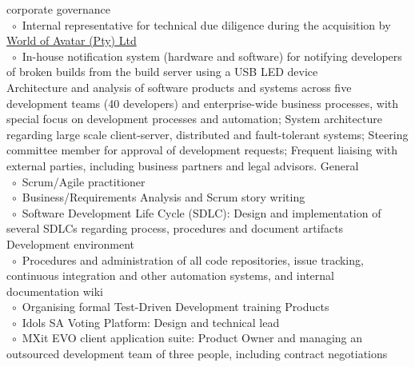 \documentclass[10pt,a4paper,final]{columncv}
\newcommand{\cvitembullet}{~$\circ$~}
\newcommand{\cvitempbullet}{\phantom{\cvitembullet}}
\begin{document}
\begin{cvenv}
{         \cvitempbullet corporate governance \\
         \cvitembullet Internal representative for technical due diligence during the 
         \cvitempbullet acquisition by \href{http://www.worldofavatar.com/}{World of Avatar (Pty) Ltd} \\
         \cvitembullet In-house notification system (hardware and software) for notifying 
         \cvitempbullet developers of broken builds from the build server using a USB
         \cvitempbullet LED device
         \\}
         {Architecture and analysis of software products and systems across five 
          development teams (40 developers) and enterprise-wide business processes, with 
          special focus on development processes and automation; System architecture 
          regarding large scale client-server, distributed and fault-tolerant systems; 
          Steering committee member for approval of development requests; Frequent 
          liaising with external parties, including business partners and legal advisors.}
         {General \\
          \cvitembullet Scrum/Agile practitioner \\
          \cvitembullet Business/Requirements Analysis and Scrum story writing \\
          \cvitembullet Software Development Life Cycle (SDLC): Design and 
          \cvitempbullet implementation of several SDLCs regarding process, procedures 
          \cvitempbullet and document artifacts \\
          Development environment \\
          \cvitembullet Procedures and administration of all code repositories, issue 
          \cvitempbullet tracking, continuous integration and other automation systems, 
          \cvitempbullet and internal documentation wiki \\
          \cvitembullet Organising formal Test-Driven Development training 
          Products \\
	  \cvitembullet Idols SA Voting Platform: Design and technical lead \\
          \cvitembullet MXit EVO client application suite: Product Owner and managing 
          \cvitempbullet an outsourced development team of three people, including 
          \cvitempbullet contract negotiations \\
}
\end{cvenv}
\end{document}
